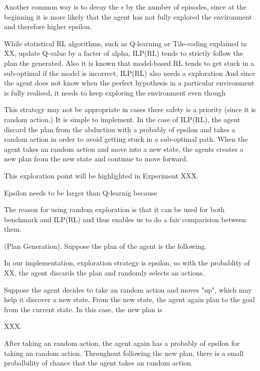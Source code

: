 Another common way is to decay the $\epsilon$ by the number of episodes, since at the beginning it is more likely that the agent has not fully explored the environment and therefore higher epsilon.

While statistical RL algorithms, such as Q-learning or Tile-coding explained in XX, update Q-value by a facter of alpha, 
ILP(RL) tends to strictly follow the plan the generated. Also it is known that model-based RL tends to get stuck in a sub-optimal if the model is incorrect, ILP(RL) also needs a exploration
And since the agent does not know when the perfect hypothesis in a particular environment is fully realised, it needs to keep exploring the environment even though

This strategy may not be appropriate in cases there safety is a priority (since it is random action.)
It is simple to implement.
In the case of ILP(RL), the agent discard the plan from the abduction with a probably of epsilon and takes a random action in order to avoid getting stuck in a sub-optimal path.
When the agent takes an random action and move into a new state, the agents creates a new plan from the new state and continue to move forward.

This exploration point will be highlighted in Experiment XXX.

Epsilon needs to be larger than Q-learnig because

The reason for using random exploration is that it can be used for both benchmark and ILP(RL) and thus enables us to do a fair comparision between them.

\begin{examp} \normalfont (Plan Generation).
Suppose the plan of the agent is the following. 

In our implementation, exploration strategy is epsilon, so with the probablity of XX, the agent discards the plan and randomly selects an actions. 

Suppose the agent decides to take an random action and moves "up", which may help it discover a new state. 
From the new state, the agent again plan to the goal from the current state. In this case, the new plan is 

XXX. 

After taking an random action, the agent again has a probably of epsilon for taking an random action. 
Throughout following the new plan, there is a small probalbility of chance that the agent takes an random action.

\end{examp}
    
